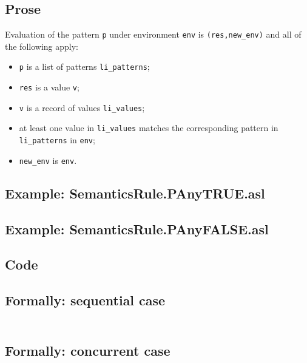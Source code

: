 \documentclass{book}
\begin{document}
    \subsection{Prose}
  Evaluation of the pattern \texttt{p} under environment \texttt{env} is
  \texttt{(res,new\_env)} and all of the following apply:
    \begin{itemize}
    \item \texttt{p} is a list of patterns \texttt{li\_patterns};
    \item \texttt{res} is a value \texttt{v};
    \item \texttt{v} is a record of values \texttt{li\_values};
    \item at least one value in \texttt{li\_values} matches the corresponding
pattern in \texttt{li\_patterns} in \texttt{env};
    \item \texttt{new\_env} is \texttt{env}.
    \end{itemize}

    \subsection{Example: SemanticsRule.PAnyTRUE.asl}

    \subsection{Example: SemanticsRule.PAnyFALSE.asl}

    \subsection{Code}

    \subsection{Formally: sequential case}
    \begin{align}
    \end{align} 

    \subsection{Formally: concurrent case}
    \begin{align}
    \end{align} 
\end{document}
